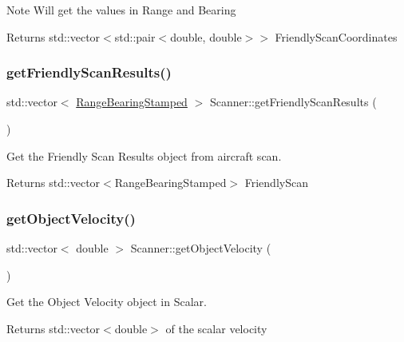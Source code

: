 \begin{DoxyNote}{Note}
Will get the values in Range and Bearing 
\end{DoxyNote}
\begin{DoxyReturn}{Returns}
std\+::vector$<$std\+::pair$<$double, double$>$$>$ Friendly\+Scan\+Coordinates 
\end{DoxyReturn}
\mbox{\label{classScanner_a27b2ba73647d40946e00bceb824712e9}} 
\subsubsection{\texorpdfstring{get\+Friendly\+Scan\+Results()}{getFriendlyScanResults()}}
{\footnotesize\ttfamily std\+::vector$<$ \hyperlink{structRangeBearingStamped}{Range\+Bearing\+Stamped} $>$ Scanner\+::get\+Friendly\+Scan\+Results (\begin{DoxyParamCaption}{ }\end{DoxyParamCaption})}



Get the Friendly Scan Results object from aircraft scan. 

\begin{DoxyReturn}{Returns}
std\+::vector$<$\+Range\+Bearing\+Stamped$>$ Friendly\+Scan 
\end{DoxyReturn}
\mbox{\label{classScanner_ac9b03f1f8b6f38f6f8144affa6be9854}} 
\subsubsection{\texorpdfstring{get\+Object\+Velocity()}{getObjectVelocity()}}
{\footnotesize\ttfamily std\+::vector$<$ double $>$ Scanner\+::get\+Object\+Velocity (\begin{DoxyParamCaption}{ }\end{DoxyParamCaption})\hspace{0.3cm}{\ttfamily [virtual]}}



Get the Object Velocity object in Scalar. 

\begin{DoxyReturn}{Returns}
std\+::vector$<$double$>$ of the scalar velocity 
\end{DoxyReturn}


